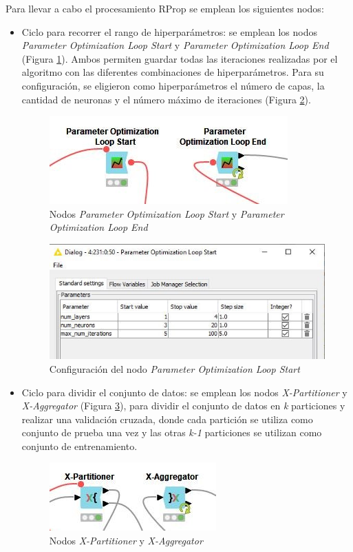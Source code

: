Para llevar a cabo el procesamiento RProp se emplean los siguientes nodos: 
\begin{itemize}
	\item Ciclo para recorrer el rango de hiperparámetros: se emplean los nodos \textit{Parameter Optimization Loop Start} y \textit{Parameter Optimization Loop End} (Figura \ref{fig:nodos-param-opt-loop}). Ambos permiten guardar todas las iteraciones realizadas por el algoritmo con las diferentes combinaciones de hiperparámetros. Para su configuración, se eligieron como hiperparámetros el número de capas, la cantidad de neuronas y el número máximo de iteraciones (Figura \ref{fig:conf-nodo-param-loop}).
	\begin{figure}[H]
		\centering
		\includegraphics[width=0.5\linewidth]{"figuras/capi 2/nodos-param-opt-loop"}
		\caption[Nodos Parameter Optimization Loop Start y Parameter Optimization Loop End]{Nodos \textit{Parameter Optimization Loop Start} y \textit{Parameter Optimization Loop End}}
		\label{fig:nodos-param-opt-loop}
	\end{figure}

	\begin{figure}[H]
		\centering
		\includegraphics[width=0.6\linewidth]{"figuras/capi 2/conf-nodo-param-loop"}
		\caption[Configuración del nodo Parameter Optimization Loop Start]{Configuración del nodo \textit{Parameter Optimization Loop Start}}
		\label{fig:conf-nodo-param-loop}
	\end{figure}
	
	\item Ciclo para dividir el conjunto de datos: se emplean los nodos \textit{X-Partitioner} y \textit{X-Aggregator} (Figura \ref{fig:nodos-cross-val}), para dividir el conjunto de datos en \textit{k} particiones y realizar una validación cruzada, donde cada partición se utiliza como conjunto de prueba una vez y las otras \textit{k-1} particiones se utilizan como conjunto de entrenamiento.
	\begin{figure}[H]
		\centering
		\includegraphics[width=0.4\linewidth]{"figuras/capi 2/nodos-cross-val"}
		\caption[Nodos X-Partitioner y X-Aggregator]{Nodos \textit{X-Partitioner} y \textit{X-Aggregator}}
		\label{fig:nodos-cross-val}
	\end{figure}


\end{itemize}
